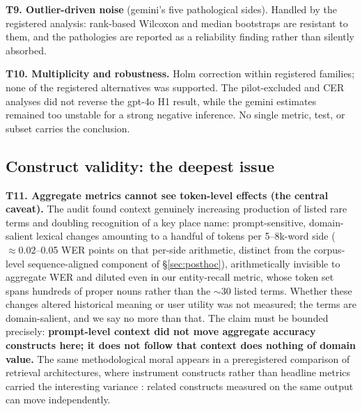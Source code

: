 \documentclass[11pt]{article}
\begin{document}
\textbf{T9. Outlier-driven noise} (gemini's five pathological sides). Handled by the registered analysis: rank-based Wilcoxon and median bootstraps are resistant to them, and the pathologies are reported as a reliability finding rather than silently absorbed.

\textbf{T10. Multiplicity and robustness.} Holm correction within registered families; none of the registered alternatives was supported. The pilot-excluded and CER analyses did not reverse the gpt-4o H1 result, while the gemini estimates remained too unstable for a strong negative inference. No single metric, test, or subset carries the conclusion.

\subsection{Construct validity: the deepest issue}

\textbf{T11. Aggregate metrics cannot see token-level effects (the central caveat).} The audit found context genuinely increasing production of listed rare terms and doubling recognition of a key place name: prompt-sensitive, domain-salient lexical changes amounting to a handful of tokens per 5--8k-word side (${\approx}0.02$--0.05 WER points on that per-side arithmetic, distinct from the corpus-level sequence-aligned component of \S\ref{sec:posthoc}), arithmetically invisible to aggregate WER and diluted even in our entity-recall metric, whose token set spans hundreds of proper nouns rather than the ${\sim}30$ listed terms. Whether these changes altered historical meaning or user utility was not measured; the terms are domain-salient, and we say no more than that. The claim must be bounded precisely: \textbf{prompt-level context did not move aggregate accuracy constructs here; it does not follow that context does nothing of domain value.} The same methodological moral appears in a preregistered comparison of retrieval architectures, where instrument constructs rather than headline metrics carried the interesting variance \citep{cochran26}: related constructs measured on the same output can move independently.
\end{document}
